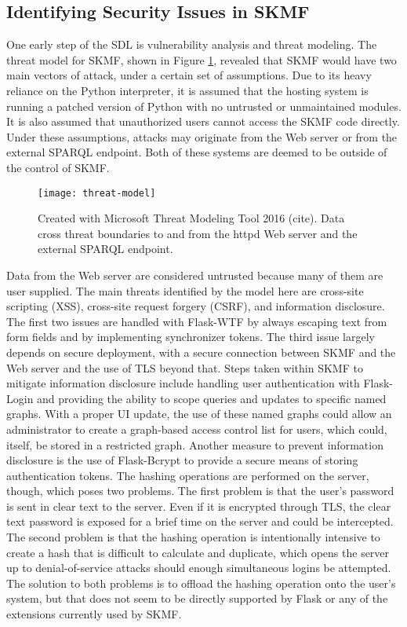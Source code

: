 \subsection{Identifying Security Issues in SKMF}

One early step of the SDL is vulnerability analysis and threat modeling. The threat model for SKMF, shown in Figure
\ref{threat-model},
revealed that SKMF would have two main vectors of attack, under a certain set of assumptions. Due to its heavy reliance on the Python interpreter, it is assumed that the hosting system is running a patched version of Python with no untrusted or unmaintained modules. It is also assumed that unauthorized users cannot access the SKMF code directly. Under these assumptions, attacks may originate from the Web server or from the external SPARQL endpoint. Both of these systems are deemed to be outside of the control of SKMF.

\begin{figure}
\texttt{[image: threat-model]}
\caption[Data flow diagram with threat boundaries]
 {\narrower Created with Microsoft Threat Modeling Tool 2016 (cite). Data cross threat boundaries to and from the httpd Web server and the external SPARQL endpoint.
 }
\label{threat-model}
\end{figure}

Data from the Web server are considered untrusted because many of them are user supplied. The main threats identified by the model here are cross-site scripting (XSS), cross-site request forgery (CSRF), and information disclosure. The first two issues are handled with Flask-WTF by always escaping text from form fields and by implementing synchronizer tokens. The third issue largely depends on secure deployment, with a secure connection between SKMF and the Web server and the use of TLS beyond that. Steps taken within SKMF to mitigate information disclosure include handling user authentication with Flask-Login and providing the ability to scope queries and updates to specific named graphs. With a proper UI update, the use of these named graphs could allow an administrator to create a graph-based access control list for users, which could, itself, be stored in a restricted graph. Another measure to prevent information disclosure is the use of Flask-Bcrypt to provide a secure means of storing authentication tokens. The hashing operations are performed on the server, though, which poses two problems. The first problem is that the user's password is sent in clear text to the server. Even if it is encrypted through TLS, the clear text password is exposed for a brief time on the server and could be intercepted. The second problem is that the hashing operation is intentionally intensive to create a hash that is difficult to calculate and duplicate, which opens the server up to denial-of-service attacks should enough simultaneous logins be attempted. The solution to both problems is to offload the hashing operation onto the user's system, but that does not seem to be directly supported by Flask or any of the extensions currently used by SKMF.

